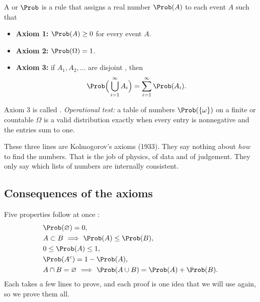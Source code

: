 \begin{workdef}
A  or  $\Prob$
is a rule that assigns a real number $\Prob(A)$ to each event $A$
 such that
\begin{itemize}[leftmargin=1.2em,itemsep=1pt]
  \item[] \textbf{Axiom 1:} $\Prob(A)\ge 0$ for every event $A$.
  \item[] \textbf{Axiom 2:} $\Prob(\Omega)=1$.
  \item[] \textbf{Axiom 3:} if $A_1,A_2,\dots$ are disjoint
  , then
  \[
    \Prob\Bigl(\,\bigcup_{i=1}^\infty A_i\Bigr)=\sum_{i=1}^\infty \Prob(A_i).
  \]
\end{itemize}
Axiom 3 is called  .
\emph{Operational test:} a table of numbers $\Prob(\{\omega\})$ on a finite or
countable $\Omega$ is a valid distribution exactly when every entry is
nonnegative and the entries sum to one.
\end{workdef}

These three lines are Kolmogorov's axioms (1933). They say nothing about
\emph{how} to find the numbers. That is the job of physics, of data and of
judgement. They only say which lists of numbers are internally consistent.

\subsection{Consequences of the axioms}

Five properties follow at once :
\begin{align}
&\Prob(\varnothing)=0, \nonumber\\
&A\subset B\ \Longrightarrow\ \Prob(A)\le\Prob(B), \nonumber\\
&0\le\Prob(A)\le 1, \label{1a:eq:props}\\
&\Prob(A^c)=1-\Prob(A), \nonumber\\
&A\cap B=\varnothing\ \Longrightarrow\ \Prob(A\cup B)=\Prob(A)+\Prob(B). \nonumber
\end{align}
Each takes a few lines to prove, and each proof is one idea that we will use
again, so we prove them all.

